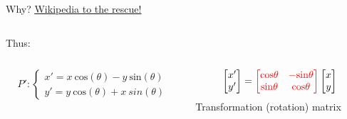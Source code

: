 \documentclass[9pt, aspectratio=169]{beamer}
\begin{document}
\begin{frame}
\begin{columns}
\begin{column}{0.5\textwidth}
            Why? \href{https://en.wikipedia.org/wiki/List\_of\_trigonometric\_identities\#Angle\_sum\_and\_difference\_identities}{\underline{Wikipedia to the rescue!}}
        \end{column}
    \end{columns}
    \pause
    Thus:
    \begin{columns}
        \begin{column}{0.5\textwidth}
            $$P': \begin{cases}x' = x~\text{cos}(\theta)-y~\text{sin}(\theta)\\y' = y~\text{cos}(\theta)+x~{sin}(\theta)\end{cases}$$
        \end{column}
        \pause
        \begin{column}{0.5\textwidth}
            $$\begin{bmatrix}x'\\y'\end{bmatrix} = \color{red}\begin{bmatrix}\text{cos}\theta&-\text{sin}\theta\\\text{sin}\theta&\text{cos}\theta\end{bmatrix}\color{black}\begin{bmatrix}x\\y\end{bmatrix}$$
            \centering
            \color{red}Transformation (rotation) matrix
        \end{column}
    \end{columns}
\end{frame}
\end{document}
